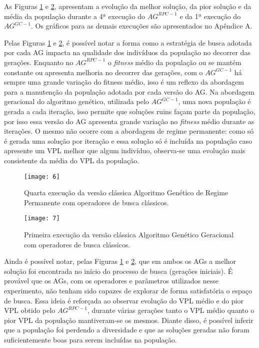 As Figuras \ref{fig:graph1_1} e \ref{fig:graph1_2}, apresentam a evolução da melhor solução, da pior solução e da média da população durante a 4ª execução do $AG^{RPC-1}$ e da 1ª execução do $AG^{GC-1}$. Os gráficos para as demais execuções são apresentados no Apêndice A.

Pelas Figuras \ref{fig:graph1_1} e \ref{fig:graph1_2}, é possível notar a forma como a estratégia de busca adotada por cada AG impacta na qualidade dos indivíduos da população no decorrer das gerações. Enquanto no $AG^{RPC-1}$ o \textit{fitness} médio da população ou se mantém constante ou apresenta melhoria no decorrer das gerações, com o $AG^{GC-1}$ há sempre uma grande variação do fitness médio, isso é um reflexo da abordagem para a manutenção da população adotada por cada versão do AG. Na abordagem geracional do algoritmo genético, utilizada pelo $AG^{GC-1}$, uma nova população é gerada a cada iteração, isso permite que soluções ruins façam parte da população, por isso essa versão do AG apresenta grande variação no \textit{fitness} médio durante as iterações. O mesmo não ocorre com a abordagem de regime permanente: como só é gerada uma solução por iteração e essa solução só é incluída na população caso apresente um VPL melhor que algum indivíduo, observa-se uma evolução mais consistente da média do VPL da população.

\begin{figure}[htb]
    \texttt{[image: 6]}
    \caption{Quarta execução da versão clássica Algoritmo Genético de Regime Permanente com operadores de busca clássicos.}
    \label{fig:graph1_1}
\end{figure}

\begin{figure}[htb]
    \texttt{[image: 7]}
    \caption{Primeira execução da versão clássica Algoritmo Genético Geracional com operadores de busca clássicos.}
    \label{fig:graph1_2}
\end{figure}

Ainda é possível notar, pelas Figuras \ref{fig:graph1_1} e \ref{fig:graph1_2}, que em ambos os AGs a melhor solução foi encontrada no início do processo de busca (gerações iniciais). É provável que os AGs, com os operadores e parâmetros utilizados nesse experimento, não tenham sido capazes de explorar de forma satisfatória o espaço de busca. Essa ideia é reforçada ao observar evolução do VPL médio e do pior VPL obtido pelo $AG^{RPC-1}$, durante várias gerações tanto o VPL médio quanto o pior VPL da população mantiveram-se os mesmos. Diante disso, é possível inferir que a população foi perdendo a diversidade e que as soluções geradas não foram suficientemente boas para serem incluídas na população.

